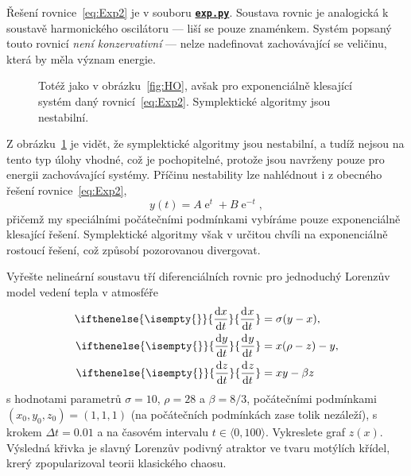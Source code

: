 \documentclass[a4paper,11pt,twoside]{article}
\DeclareMathOperator{\e}{e}
\renewcommand{\d}{\mathrm{d}}
\newcommand{\derivative}[3][]{\ifthenelse{\isempty{#1}}	    %
	{\frac{\d{#2}}{\d{#3}}}
	{\frac{\d^{#1}{#2}}{\d{#3}^{#1}}}
}
\def\ghfile#1#2{\textnormal{\textbf{\texttt{\href{https://github.com/PavelStransky/PCInPhysics2021/blob/main/#1#2}{#2}}}}}
\theoremstyle{red}
\theoremstyle{green}
\begin{document}
\begin{solution}
    Řešení rovnice~\eqref{eq:Exp2} je v souboru \ghfile{python/ode/}{exp.py}.
    Soustava rovnic je analogická k soustavě harmonického oscilátoru --- liší se pouze znaménkem.
    Systém popsaný touto rovnicí \emph{není konzervativní} --- nelze nadefinovat zachovávající se veličinu, která by měla význam energie.

    \begin{figure}[!htbp]
        \centering
        \caption{
            \protect\small
            Totéž jako v obrázku~\ref{fig:HO}, avšak pro exponenciálně klesající systém daný rovnicí~\eqref{eq:Exp2}.
            Symplektické algoritmy jsou nestabilní.
            }	
        \label{fig:Exp2}
    \end{figure}
    
    Z obrázku~\ref{fig:Exp2} je vidět, že symplektické algoritmy jsou nestabilní, a tudíž nejsou na tento typ úlohy vhodné, což je pochopitelné, protože jsou navrženy pouze pro energii zachovávající systémy.
    Příčinu nestability lze nahlédnout i z obecného řešení rovnice~\eqref{eq:Exp2},
    \begin{equation}
        y(t)=A\e^{t}+B\e^{-t},
    \end{equation}
    přičemž my speciálními počátečními podmínkami vybíráme pouze exponenciálně klesající řešení.
    Symplektické algoritmy však v určitou chvíli  na exponenciálně rostoucí řešení, což způsobí pozorovanou divergovat.
\end{solution}

\begin{task}
    Vyřešte nelineární soustavu tří diferenciálních rovnic pro jednoduchý Lorenzův model vedení tepla v atmosféře
    \begin{align}
        \derivative{x}{t}&=\sigma(y-x),\nonumber\\
        \label{eq:Lorenz}
        \derivative{y}{t}&=x(\rho-z)-y,\\
        \derivative{z}{t}&=xy-\beta z\nonumber
    \end{align}
    s hodnotami parametrů $\sigma=10$, $\rho=28$ a $\beta=8/3$, počátečními podmínkami $(x_0, y_0, z_0)=(1,1,1)$ (na počátečních podmínkách zase tolik nezáleží), s krokem $\Delta t=0.01$ a na časovém intervalu $t\in\langle0,100\rangle$.
    Vykreslete graf $z(x)$.
    Výsledná křivka je slavný Lorenzův podivný atraktor ve tvaru motýlích křídel, krerý zpopularizoval teorii klasického chaosu.
\end{task}
\end{document}
